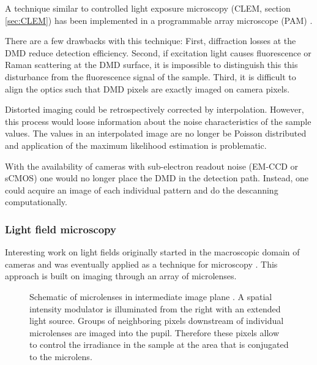 A technique similar to controlled light exposure microscopy (CLEM,
section \ref{sec:CLEM}) has been implemented in a programmable array
microscope (PAM) \citep{Caarls2011}. 


There are a few drawbacks with this technique: First, diffraction
losses at the DMD reduce detection efficiency. Second, if excitation
light causes fluorescence or Raman scattering at the DMD surface, it
is impossible to distinguish this this disturbance from the
fluorescence signal of the sample. Third, it is difficult to align the
optics such that DMD pixels are exactly imaged on camera pixels. 

Distorted imaging could be retrospectively corrected by
interpolation. However, this process would loose information about the
noise characteristics of the sample values. The values in an
interpolated image are no longer be Poisson distributed and
application of the maximum likelihood estimation is problematic.

With the availability of cameras with sub-electron readout noise
(EM-CCD or sCMOS) one would no longer place the DMD in the detection
path. Instead, one could acquire an image of each individual pattern
and do the descanning computationally.


%
%
%

\subsubsection{Light field microscopy}
\label{sec:light-field-microscopy}
Interesting work on light fields originally started in the macroscopic
domain of cameras \citep{Lippmann1908%
} and was eventually applied as a technique for microscopy
\citep{Levoy2006,Levoy2009,Zhang2009}. This approach is built on
imaging through an array of microlenses.
\begin{figure}[!hbt]
  \centering
  \caption{Schematic of microlenses in intermediate image plane
    \citep[inspired from][]{Levoy2006}. A spatial intensity modulator
    is illuminated from the right with an extended light
    source. Groups of neighboring pixels downstream of individual
    microlenses are imaged into the pupil. Therefore these pixels
    allow to control the irradiance in the sample at the area that is
    conjugated to the microlens. }
  \label{fig:microlens-levoy-sketch}
\end{figure}


